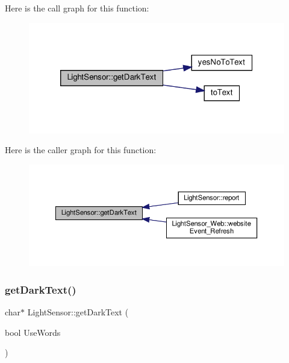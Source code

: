 Here is the call graph for this function\+:
\nopagebreak
\begin{figure}[H]
\begin{center}
\leavevmode
\includegraphics[width=320pt]{class_light_sensor_a70fd8f7252cbc9abb2ea501ccfaf08fe_cgraph}
\end{center}
\end{figure}
Here is the caller graph for this function\+:
\nopagebreak
\begin{figure}[H]
\begin{center}
\leavevmode
\includegraphics[width=350pt]{class_light_sensor_a70fd8f7252cbc9abb2ea501ccfaf08fe_icgraph}
\end{center}
\end{figure}
\mbox{\label{class_light_sensor_a701ea113624ff3188aa728930c7869de}} 
\subsubsection{\texorpdfstring{get\+Dark\+Text()}{getDarkText()}\hspace{0.1cm}{\footnotesize\ttfamily [2/2]}}
{\footnotesize\ttfamily char$\ast$ Light\+Sensor\+::get\+Dark\+Text (\begin{DoxyParamCaption}\item[{bool}]{Use\+Words }\end{DoxyParamCaption})}

